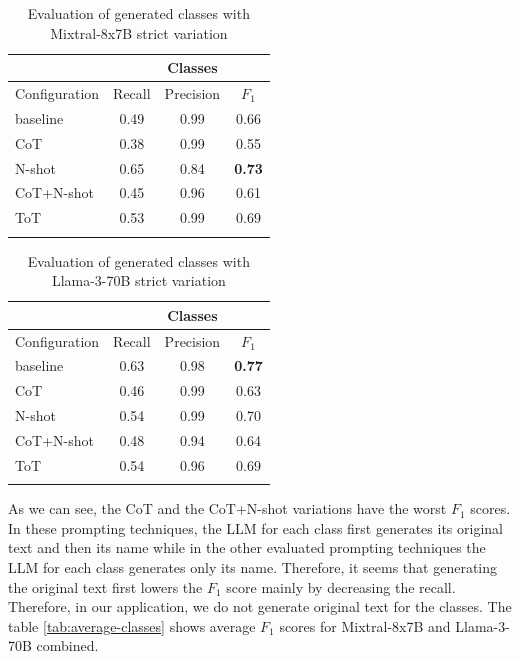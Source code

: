 \begin{table}[!h]
    \scriptsize
    \centering
    \setlength{\tabcolsep}{0.5em}
    \begin{tabular}{lccc}
    \toprule
         & & Classes & \\
     \toprule
        Configuration & Recall & Precision & $F_1$ \\
    \toprule
    
    \addlinespace
         baseline    & 0.49 & 0.99 & 0.66 \\
    	 CoT         & 0.38 & 0.99 & 0.55 \\
         N-shot      & 0.65 & 0.84 & \textbf{0.73} \\
         CoT+N-shot  & 0.45 & 0.96 & 0.61 \\
         ToT         & 0.53 & 0.99 & 0.69 \\
    \addlinespace
    \bottomrule
    \addlinespace
    \end{tabular}
    \caption{Evaluation of generated classes with Mixtral-8x7B strict variation}
    \label{tab:mixtral-classes}
\end{table}


\begin{table}[!h]
    \scriptsize
    \centering
    \setlength{\tabcolsep}{0.5em}
    \begin{tabular}{lccc}
    \toprule
    & & Classes & \\
    \toprule
        Configuration & Recall & Precision & $F_1$ \\
    \toprule
    
    \addlinespace
         baseline    & 0.63 & 0.98 & \textbf{0.77} \\
    	 CoT         & 0.46 & 0.99 & 0.63 \\
         N-shot      & 0.54 & 0.99 & 0.70 \\
         CoT+N-shot  & 0.48 & 0.94 & 0.64 \\
         ToT         & 0.54 & 0.96 & 0.69 \\
    \addlinespace
    \bottomrule
    \addlinespace
    \end{tabular}
    \caption{Evaluation of generated classes with Llama-3-70B strict variation}
    \label{tab:llama-classes}
\end{table}



As we can see, the CoT and the CoT+N-shot variations have the worst $F_1$ scores. In these prompting techniques, the LLM for each class first generates its original text and then its name while in the other evaluated prompting techniques the LLM for each class generates only its name. Therefore, it seems that generating the original text first lowers the $F_1$ score mainly by decreasing the recall. Therefore, in our application, we do not generate original text for the classes. The table \ref{tab:average-classes} shows average $F_1$ scores for Mixtral-8x7B and Llama-3-70B combined.


